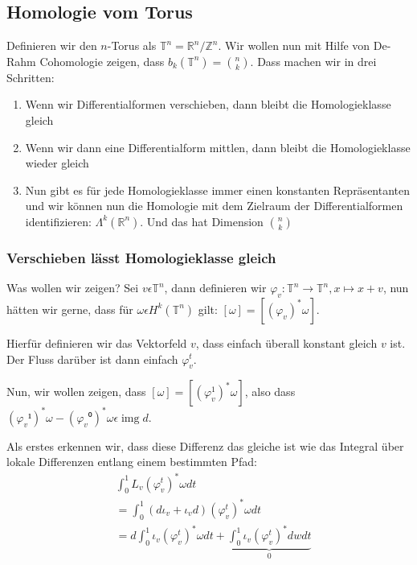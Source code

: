 \documentclass{article}
\DeclareMathOperator{\img}{img}
\begin{document}
	\subsection{Homologie vom Torus}

	\newcommand{\torus}{\mathbb{T}^n}
	Definieren wir den $n$-Torus als $\torus = ℝ^n/ℤ^n$. Wir wollen nun mit Hilfe von De-Rahm Cohomologie zeigen, dass $b_k(\mathbb{T}^n) = \binom{n}{k}$. Dass machen wir in drei Schritten:
	\begin{enumerate}
		\item Wenn wir Differentialformen verschieben, dann bleibt die Homologieklasse gleich
		\item Wenn wir dann eine Differentialform mittlen, dann bleibt die Homologieklasse wieder gleich
		\item Nun gibt es für jede Homologieklasse immer einen konstanten Repräsentanten und wir können nun die Homologie mit dem Zielraum der Differentialformen identifizieren: $Λ^k(ℝ^n)$. Und das hat Dimension $\binom{n}{k}$
	\end{enumerate}

	\subsubsection{Verschieben lässt Homologieklasse gleich}

	Was wollen wir zeigen? Sei $v ϵ \torus$, dann definieren wir $φ_v: \torus → \torus, x ↦ x + v$, nun hätten wir gerne, dass für $ωϵH^k(\torus)$ gilt: $[ω] = [(φ_v)^* ω]$.

	\medskip

	Hierfür definieren wir das Vektorfeld $v$, dass einfach überall konstant gleich $v$ ist. Der Fluss darüber ist dann einfach $φ_v^t$.

	\medskip

	Nun, wir wollen zeigen, dass $[ω] = [(φ_v^1)^* ω]$, also dass $(φ_v¹)^* ω - (φ_v⁰)^* ω ϵ \img d$.

	\medskip

	Als erstes erkennen wir, dass diese Differenz das gleiche ist wie das Integral über lokale Differenzen entlang einem bestimmten Pfad:
	\begin{equation*}
		\begin{split}
			&\int_0^1 L_v (φ_v^t)^* ω dt \\
			&= \int_0^1 (dι_v + ι_vd) (φ_v^t)^* ω dt \\
			&= d \int_0^1 ι_v (φ_v^t)^* ω dt + \underbrace{\int_0^1 ι_v (φ_v^t)^* dw dt}_0
		\end{split}
	\end{equation*}
\end{document}
